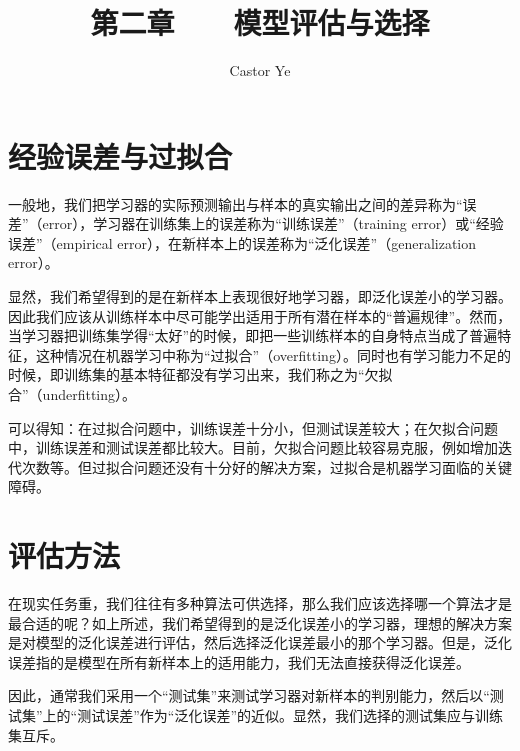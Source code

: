 \documentclass[12pt, a4paper]{article} %
\title{第二章 \ \ \ 模型评估与选择} %
\author{Castor Ye} %
\date{} %
\begin{document}
\maketitle %
\newtheorem{definition}{定义}[section]
\newtheorem{theorem}{定理}[section]
\newtheorem{example}{例}[section]
\newtheorem{solution}{题解}
\newtheorem{algorithm}{算法}
\newtheorem{axiom}{公理}
\newtheorem{property}{性质}
\newtheorem{proposition}{命题}
\newtheorem{lemma}{引理}
\newtheorem{corollary}{推论}[section]
\newtheorem{remark}{注解}
\newtheorem{condition}{条件}
\newtheorem{conclusion}{结论}
\newtheorem{assumption}{假设}
\renewcommand{\figurename}{图} %
\renewcommand{\tablename}{表} %
\section{经验误差与过拟合}

一般地，我们把学习器的实际预测输出与样本的真实输出之间的差异称为“误差”（error），学习器在训练集上的误差称为“训练误差”（training error）或“经验误差”（empirical error），在新样本上的误差称为“泛化误差”（generalization error）。

显然，我们希望得到的是在新样本上表现很好地学习器，即泛化误差小的学习器。因此我们应该从训练样本中尽可能学出适用于所有潜在样本的“普遍规律”。然而，当学习器把训练集学得“太好”的时候，即把一些训练样本的自身特点当成了普遍特征，这种情况在机器学习中称为“过拟合”（overfitting）。同时也有学习能力不足的时候，即训练集的基本特征都没有学习出来，我们称之为“欠拟合”（underfitting）。

可以得知：在过拟合问题中，训练误差十分小，但测试误差较大；在欠拟合问题中，训练误差和测试误差都比较大。目前，欠拟合问题比较容易克服，例如增加迭代次数等。但过拟合问题还没有十分好的解决方案，过拟合是机器学习面临的关键障碍。

\section{评估方法}

在现实任务重，我们往往有多种算法可供选择，那么我们应该选择哪一个算法才是最合适的呢？如上所述，我们希望得到的是泛化误差小的学习器，理想的解决方案是对模型的泛化误差进行评估，然后选择泛化误差最小的那个学习器。但是，泛化误差指的是模型在所有新样本上的适用能力，我们无法直接获得泛化误差。

因此，通常我们采用一个“测试集”来测试学习器对新样本的判别能力，然后以“测试集”上的“测试误差”作为“泛化误差”的近似。显然，我们选择的测试集应与训练集互斥。
\end{document}
